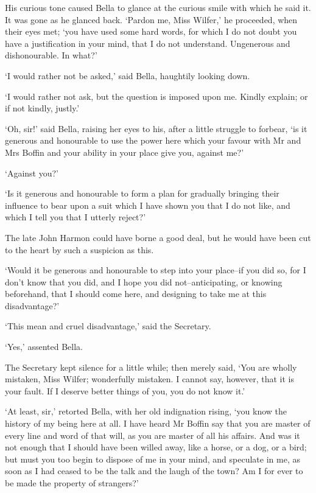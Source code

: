 His curious tone caused Bella to glance at the curious smile with which
he said it. It was gone as he glanced back. ‘Pardon me, Miss Wilfer,’
he proceeded, when their eyes met; ‘you have used some hard words, for
which I do not doubt you have a justification in your mind, that I do
not understand. Ungenerous and dishonourable. In what?’

‘I would rather not be asked,’ said Bella, haughtily looking down.

‘I would rather not ask, but the question is imposed upon me. Kindly
explain; or if not kindly, justly.’

‘Oh, sir!’ said Bella, raising her eyes to his, after a little struggle
to forbear, ‘is it generous and honourable to use the power here which
your favour with Mr and Mrs Boffin and your ability in your place give
you, against me?’

‘Against you?’

‘Is it generous and honourable to form a plan for gradually bringing
their influence to bear upon a suit which I have shown you that I do not
like, and which I tell you that I utterly reject?’

The late John Harmon could have borne a good deal, but he would have
been cut to the heart by such a suspicion as this.

‘Would it be generous and honourable to step into your place--if you did
so, for I don’t know that you did, and I hope you did not--anticipating,
or knowing beforehand, that I should come here, and designing to take me
at this disadvantage?’

‘This mean and cruel disadvantage,’ said the Secretary.

‘Yes,’ assented Bella.

The Secretary kept silence for a little while; then merely said, ‘You
are wholly mistaken, Miss Wilfer; wonderfully mistaken. I cannot say,
however, that it is your fault. If I deserve better things of you, you
do not know it.’

‘At least, sir,’ retorted Bella, with her old indignation rising, ‘you
know the history of my being here at all. I have heard Mr Boffin say
that you are master of every line and word of that will, as you are
master of all his affairs. And was it not enough that I should have been
willed away, like a horse, or a dog, or a bird; but must you too begin
to dispose of me in your mind, and speculate in me, as soon as I had
ceased to be the talk and the laugh of the town? Am I for ever to be
made the property of strangers?’

